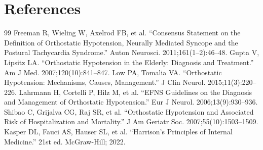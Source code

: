 \section*{References}
\begin{thebibliography}{99}
 Freeman R, Wieling W, Axelrod FB, et al. ``Consensus Statement on the Definition of Orthostatic Hypotension, Neurally Mediated Syncope and the Postural Tachycardia Syndrome.'' Auton Neurosci. 2011;161(1--2):46--48.
 Gupta V, Lipsitz LA. ``Orthostatic Hypotension in the Elderly: Diagnosis and Treatment.'' Am J Med. 2007;120(10):841--847.
 Low PA, Tomalia VA. ``Orthostatic Hypotension: Mechanisms, Causes, Management.'' J Clin Neurol. 2015;11(3):220--226.
 Lahrmann H, Cortelli P, Hilz M, et al. ``EFNS Guidelines on the Diagnosis and Management of Orthostatic Hypotension.'' Eur J Neurol. 2006;13(9):930--936.
 Shibao C, Grijalva CG, Raj SR, et al. ``Orthostatic Hypotension and Associated Risk of Hospitalization and Mortality.'' J Am Geriatr Soc. 2007;55(10):1503--1509.
 Kasper DL, Fauci AS, Hauser SL, et al. ``Harrison's Principles of Internal Medicine.'' 21st ed. McGraw-Hill; 2022.
\end{thebibliography}
